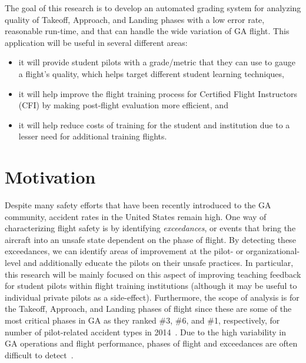 	The goal of this research is to develop an automated grading system for analyzing quality of Takeoff, Approach, and Landing phases with a low error rate, reasonable run-time, and that can handle the wide variation of GA flight.  This application will be useful in several different areas:
%
    \begin{itemize}
    	\item it will provide student pilots with a grade/metric that they can use to gauge a flight's quality, which helps target different student learning techniques,
        \item it will help improve the flight training process for Certified Flight Instructors (CFI) by making post-flight evaluation more efficient, and
        \item it will help reduce costs of training for the student and institution due to a lesser need for additional training flights.
    \end{itemize}
    

\section{Motivation} \label{sec:motivation}

	Despite many safety efforts that have been recently introduced to the GA community, accident rates in the United States remain high.  One way of characterizing flight safety is by identifying \textit{exceedances}, or events that bring the aircraft into an unsafe state dependent on the phase of flight.  By detecting these exceedances, we can identify areas of improvement at the pilot- or organizational-level and additionally educate the pilots on their unsafe practices.  In particular, this research will be mainly focused on this aspect of improving teaching feedback for student pilots within flight training institutions (although it may be useful to individual private pilots as a side-effect).  Furthermore, the scope of analysis is for the Takeoff, Approach, and Landing phases of flight since these are some of the most critical phases in GA as they ranked \#3, \#6, and \#1, respectively, for number of pilot-related accident types in 2014~\cite{kenny201726th}.  Due to the high variability in GA operations and flight performance, phases of flight and exceedances are often difficult to detect~\cite{goblet2015identifying,goblet2016phase,fala2016detecting}.
    


